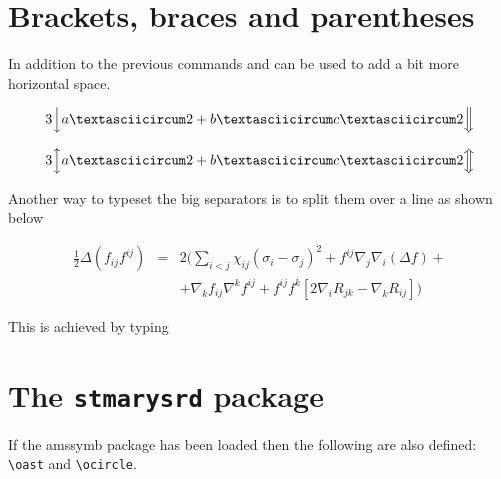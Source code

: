 \section{Brackets, braces and parentheses}

In addition  to the previous commands  and  can be used to add a bit more horizontal space.

\[3\Big\downarrow aˆ2+bˆ{cˆ2}
\Big\Downarrow\]


$$3\Big\updownarrow
aˆ2+bˆ{cˆ2}
\Big\Updownarrow$$

Another way to typeset the big separators is to split them over a line as shown below

{\arraycolsep=2pt
 \begin{equation}
 \begin{array}{rcl}
 \frac{1}{2}\Delta(f_{ij}f^{ij}) & = & 2\Bigg({\displaystyle
 \sum_{i<j}}\chi_{ij}(\sigma_{i}-\sigma_{j})^{2}+f^{ij}%
 \nabla_{j}\nabla_{i}(\Delta f)+\\
 & & +\nabla_{k}f_{ij}\nabla^{k}f^{ij}+f^{ij}f^{k}[2
 \nabla_{i}R_{jk}-\nabla_{k}R_{ij}]\Bigg)
 \end{array}
 \end{equation}

This is achieved by typing

\begin{teX}
{\arraycolsep=2pt
 \begin{equation}
 \begin{array}{rcl}
 \frac{1}{2}\Delta(f_{ij}f^{ij}) & = & 2\Bigg({\displaystyle
 \sum_{i<j}}\chi_{ij}(\sigma_{i}-\sigma_{j})^{2}+f^{ij}%
 \nabla_{j}\nabla_{i}(\Delta f)+\\
 & & +\nabla_{k}f_{ij}\nabla^{k}f^{ij}+f^{ij}f^{k}[2
 \nabla_{i}R_{jk}-\nabla_{k}R_{ij}]\Bigg)
 \end{array}
 \end{equation}

\end{teX}



\section*{The \texttt{stmarysrd} package}

 If the \textsf{amssymb} package has been loaded then the following
 are also defined: \verb|\oast| and \verb|\ocircle|.

}
